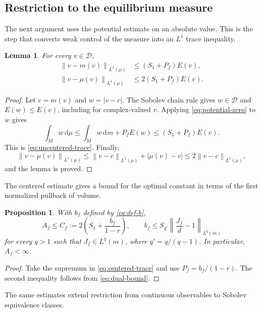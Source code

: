 \documentclass[11pt,reqno]{amsart}
\theoremstyle{plain}
\newtheorem{proposition}[theorem]{Proposition}
\newtheorem{lemma}[theorem]{Lemma}
\theoremstyle{definition}
\theoremstyle{remark}
\newcommand{\Dcal}{\mathcal D}
\newcommand{\norm}[1]{\left\lVert #1\right\rVert}
\newcommand{\dd}{\mathrm d}
\numberwithin{equation}{section}
\begin{document}
\subsection{Restriction to the equilibrium measure}

The next argument uses the potential estimate on an absolute value. This is the step that converts weak control of the measure into an $L^1$ trace inequality.

\begin{lemma}\label{lem:trace}
For every $v\in\Dcal$,
\begin{align}
 \norm{v-m(v)}_{L^1(\mu)}&\le (S_1+P_f)E(v),\label{eq:uncentered-trace}\\
 \norm{v-\mu(v)}_{L^1(\mu)}&\le 2(S_1+P_f)E(v).\label{eq:centered-trace}
\end{align}
\end{lemma}

\begin{proof}
Let $c=m(v)$ and $w=|v-c|$. The Sobolev chain rule gives $w\in\Dcal$ and $E(w)\le E(v)$, including for complex-valued $v$. Applying \eqref{eq:potential-zero} to $w$ gives
\[
 \int_Mw\,\dd\mu
 \le\int_Mw\,\dd m+P_fE(w)
 \le(S_1+P_f)E(v).
\]
This is \eqref{eq:uncentered-trace}. Finally,
\[
 \norm{v-\mu(v)}_{L^1(\mu)}
 \le\norm{v-c}_{L^1(\mu)}+|\mu(v)-c|
 \le2\norm{v-c}_{L^1(\mu)},
\]
and the lemma is proved.
\end{proof}

The centered estimate gives a bound for the optimal constant in terms of the first normalized pullback of volume.

\begin{proposition}\label{prop:prefactor-bound}
With $b_f$ defined by \eqref{eq:def-b},
\begin{equation}\label{eq:main-constant}
 A_f\le C_f:=2\left(S_1+\frac{b_f}{1-r}\right),
 \qquad
 b_f\le S_{q'}\norm{\frac{J_f}{d}-1}_{L^q(m)}
\end{equation}
for every $q>1$ such that $J_f\in L^q(m)$, where $q'=q/(q-1)$. In particular, $A_f<\infty$.
\end{proposition}

\begin{proof}
Take the supremum in \eqref{eq:centered-trace} and use $P_f=b_f/(1-r)$. The second inequality follows from \eqref{eq:dual-bound}.
\end{proof}

The same estimates extend restriction from continuous observables to Sobolev equivalence classes.
\end{document}
